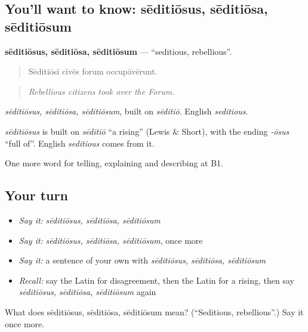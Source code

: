 \subsection*{You'll want to know: sēditiōsus, sēditiōsa, sēditiōsum}
\textbf{sēditiōsus, sēditiōsa, sēditiōsum} — \textquotedblleft{}seditious, rebellious\textquotedblright{}.

\begin{quote}
Sēditiōsī cīvēs forum occupāvērunt.
\end{quote}

\begin{quote}
\emph{Rebellious citizens took over the Forum.}
\end{quote}

\emph{sēditiōsus, sēditiōsa, sēditiōsum}, built on \emph{sēditiō}. English \emph{seditious}.

\begin{cousinweb}
\emph{sēditiōsus} is built on \emph{sēditiō} \textquotedblleft{}a rising\textquotedblright{} (Lewis \& Short), with the ending \emph{-ōsus} \textquotedblleft{}full of\textquotedblright{}. English \emph{seditious} comes from it.
\end{cousinweb}

\begin{grammarlens}[title={What you've built}]
One more word for telling, explaining and describing at B1.
\end{grammarlens}

\subsection*{Your turn}
\begin{itemize}
\raggedright
  \item \emph{Say it:} \emph{sēditiōsus, sēditiōsa, sēditiōsum}
  \item \emph{Say it:} \emph{sēditiōsus, sēditiōsa, sēditiōsum}, once more
  \item \emph{Say it:} a sentence of your own with \emph{sēditiōsus, sēditiōsa, sēditiōsum}
  \item \emph{Recall:} say the Latin for disagreement, then the Latin for a rising, then say \emph{sēditiōsus, sēditiōsa, sēditiōsum} again
\end{itemize}

\begin{tcolorbox}[breakable,colback=teal!4,colframe=teal!35!black,title={Before you move on}]
What does sēditiōsus, sēditiōsa, sēditiōsum mean? (\textquotedblleft{}Seditious, rebellious\textquotedblright{}.) Say it once more.
\end{tcolorbox}
